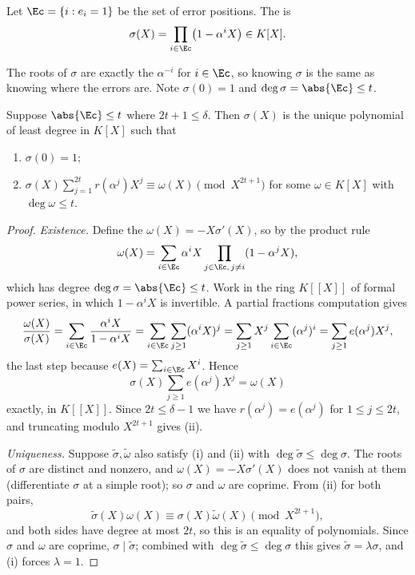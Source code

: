 \begin{definition}
	Let $\Ec = \{i : e_i = 1\}$ be the set of error positions. The  is
	$$\sigma(X) = \prod_{i\in\Ec}\bigl(1-\alpha^iX\bigr) \in K[X].$$
\end{definition}

The roots of $\sigma$ are exactly the $\alpha^{-i}$ for $i \in \Ec$, so knowing $\sigma$ is the same as knowing where the errors are. Note $\sigma(0)=1$ and $\deg\sigma = \abs{\Ec} \le t$.

\begin{theorem}\label{thm:errorlocator}
	Suppose $\abs{\Ec}\le t$ where $2t+1\le\delta$. Then $\sigma(X)$ is the unique polynomial of least degree in $K[X]$ such that
	\begin{enumerate}[label=(\roman*)]
		\item $\sigma(0) = 1$;
		\item $\displaystyle \sigma(X)\sum_{j=1}^{2t}r(\alpha^j)X^j \equiv \omega(X) \pmod{X^{2t+1}}$ for some $\omega \in K[X]$ with $\deg\omega\le t$.
	\end{enumerate}
\end{theorem}

\begin{proof}
	\emph{Existence.} Define the  $\omega(X) = -X\sigma'(X)$, so by the product rule
	$$\omega(X) = \sum_{i\in\Ec}\alpha^iX\prod_{j\in\Ec,\, j\ne i}(1-\alpha^jX),$$
	which has degree $\deg \sigma = \abs{\Ec}\le t$. Work in the ring $K[[X]]$ of formal power series, in which $1-\alpha^iX$ is invertible. A partial fractions computation gives
	$$\frac{\omega(X)}{\sigma(X)} = \sum_{i\in\Ec}\frac{\alpha^iX}{1-\alpha^iX} = \sum_{i\in\Ec}\sum_{j\ge1}(\alpha^iX)^j = \sum_{j\ge1}X^j\sum_{i\in\Ec}(\alpha^j)^i = \sum_{j\ge1}e(\alpha^j)X^j,$$
	the last step because $e(X) = \sum_{i\in\Ec}X^i$. Hence
	$$\sigma(X)\sum_{j\ge1}e(\alpha^j)X^j = \omega(X)$$
	exactly, in $K[[X]]$. Since $2t \le \delta-1$ we have $r(\alpha^j)=e(\alpha^j)$ for $1 \le j\le 2t$, and truncating modulo $X^{2t+1}$ gives (ii).

	\emph{Uniqueness.} Suppose $\widetilde\sigma,\widetilde\omega$ also satisfy (i) and (ii) with $\deg\widetilde\sigma\le\deg\sigma$. The roots of $\sigma$ are distinct and nonzero, and $\omega(X) = -X\sigma'(X)$ does not vanish at them (differentiate $\sigma$ at a simple root); so $\sigma$ and $\omega$ are coprime. From (ii) for both pairs,
	$$\widetilde\sigma(X)\omega(X)\equiv\sigma(X)\widetilde\omega(X) \pmod{X^{2t+1}},$$
	and both sides have degree at most $2t$, so this is an equality of polynomials. Since $\sigma$ and $\omega$ are coprime, $\sigma\mid\widetilde\sigma$; combined with $\deg\widetilde\sigma\le\deg\sigma$ this gives $\widetilde\sigma = \lambda\sigma$, and (i) forces $\lambda = 1$.
\end{proof}

